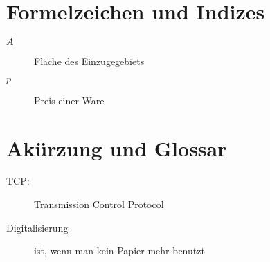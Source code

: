 
\section *{Formelzeichen und Indizes} %

\begin{description}
\item[$A$] Fläche des Einzugegebiets
\item[$p$] Preis einer Ware
\end{description}

\section *{Akürzung und Glossar}
\begin{description}
\item[TCP:] Transmission Control Protocol
\item[Digitalisierung] ist, wenn man kein Papier mehr benutzt
\end{description}
